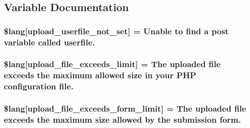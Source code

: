 \subsection{Variable Documentation}
\hypertarget{system_2language_2english_2upload__lang_8php_a6d12ff4074b1e4c6f22a4a5107fae5ee}{}
\subsubsection[{\$lang}]{\setlength{\rightskip}{0pt plus 5cm}\$lang\mbox{[}\textquotesingle{}upload\+\_\+userfile\+\_\+not\+\_\+set\textquotesingle{}\mbox{]} = \textquotesingle{}Unable to find {\bf a} post variable called userfile.\textquotesingle{}}\label{system_2language_2english_2upload__lang_8php_a6d12ff4074b1e4c6f22a4a5107fae5ee}
\hypertarget{system_2language_2english_2upload__lang_8php_a9028f049ebbe292a27e0e2b2e5f7d660}{}
\subsubsection[{\$lang}]{\setlength{\rightskip}{0pt plus 5cm}\$lang\mbox{[}\textquotesingle{}upload\+\_\+file\+\_\+exceeds\+\_\+limit\textquotesingle{}\mbox{]} = \textquotesingle{}The uploaded file exceeds the maximum allowed size in your P\+H\+P configuration file.\textquotesingle{}}\label{system_2language_2english_2upload__lang_8php_a9028f049ebbe292a27e0e2b2e5f7d660}
\hypertarget{system_2language_2english_2upload__lang_8php_af6f65d563af150d50dfc6957079fd529}{}
\subsubsection[{\$lang}]{\setlength{\rightskip}{0pt plus 5cm}\$lang\mbox{[}\textquotesingle{}upload\+\_\+file\+\_\+exceeds\+\_\+form\+\_\+limit\textquotesingle{}\mbox{]} = \textquotesingle{}The uploaded file exceeds the maximum size allowed by the submission form.\textquotesingle{}}\label{system_2language_2english_2upload__lang_8php_af6f65d563af150d50dfc6957079fd529}
\hypertarget{system_2language_2english_2upload__lang_8php_a79751b02ce35007a90bd9052f83deed9}{}
